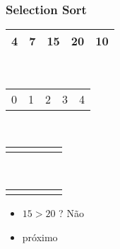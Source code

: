 \documentclass{beamer}
\begin{document}
\begin{frame}
    \frametitle{Selection Sort}
    \begin{center}
        \begin{table}
            \begin{tabular}{| p{0.25cm} | p{0.25cm} | p{0.25cm} | p{0.25cm} | p{0.25cm} |}
                \hline
                4 & 7 & 15 & 20 & 10 \\ \hline
            \end{tabular} \\
            \begin{tabular}{p{0.25cm} p{0.25cm} p{0.25cm} p{0.25cm} p{0.25cm}}
                0 & 1 & 2 & 3 & 4
            \end{tabular} \\
            \begin{tabular}{p{0.25cm} p{0.25cm} p{0.25cm} p{0.25cm} p{0.25cm}}
                 & & \color{blue}{$\uparrow$} & \color{red}{$\uparrow$}  &
            \end{tabular} \\
            \begin{tabular}{p{0.25cm} p{0.25cm} p{0.25cm} p{0.25cm} p{0.25cm}}
                 & & \color{blue}{i} & \color{red}{j}  &
            \end{tabular}
        \end{table}
	\end{center}
    \color{green}{$troca = 2$}
    \begin{itemize}[<+->]
        \item $15 > 20$ ? Não
        \item próximo
    \end{itemize}
\end{frame}
\end{document}
